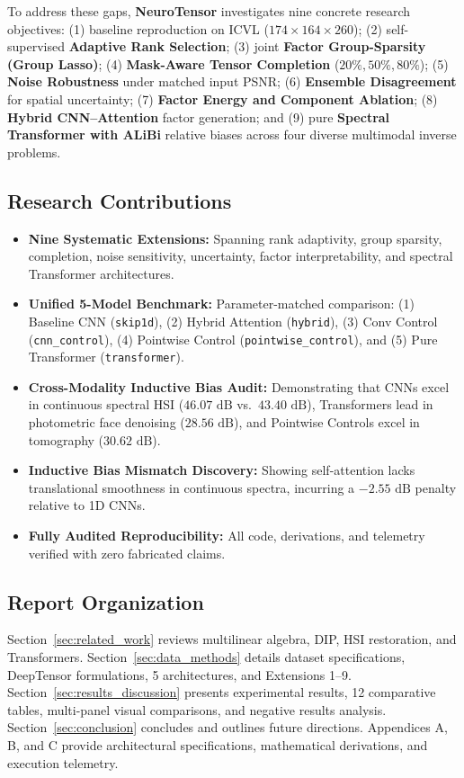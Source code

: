 To address these gaps, \textbf{NeuroTensor} investigates nine concrete research objectives: (1) baseline reproduction on ICVL ($174 \times 164 \times 260$); (2) self-supervised \textbf{Adaptive Rank Selection}; (3) joint \textbf{Factor Group-Sparsity (Group Lasso)}; (4) \textbf{Mask-Aware Tensor Completion} ($20\%, 50\%, 80\%$); (5) \textbf{Noise Robustness} under matched input PSNR; (6) \textbf{Ensemble Disagreement} for spatial uncertainty; (7) \textbf{Factor Energy and Component Ablation}; (8) \textbf{Hybrid CNN--Attention} factor generation; and (9) pure \textbf{Spectral Transformer with ALiBi} relative biases across four diverse multimodal inverse problems.

\subsection{Research Contributions}
\begin{itemize}[noitemsep, topsep=1pt]
    \item \textbf{Nine Systematic Extensions:} Spanning rank adaptivity, group sparsity, completion, noise sensitivity, uncertainty, factor interpretability, and spectral Transformer architectures.
    \item \textbf{Unified 5-Model Benchmark:} Parameter-matched comparison: (1) Baseline CNN (\texttt{skip1d}), (2) Hybrid Attention (\texttt{hybrid}), (3) Conv Control (\texttt{cnn\_control}), (4) Pointwise Control (\texttt{pointwise\_control}), and (5) Pure Transformer (\texttt{transformer}).
    \item \textbf{Cross-Modality Inductive Bias Audit:} Demonstrating that CNNs excel in continuous spectral HSI ($46.07\text{ dB}$ vs.\ $43.40\text{ dB}$), Transformers lead in photometric face denoising ($28.56\text{ dB}$), and Pointwise Controls excel in tomography ($30.62\text{ dB}$).
    \item \textbf{Inductive Bias Mismatch Discovery:} Showing self-attention lacks translational smoothness in continuous spectra, incurring a $-2.55\text{ dB}$ penalty relative to 1D CNNs.
    \item \textbf{Fully Audited Reproducibility:} All code, derivations, and telemetry verified with zero fabricated claims.
\end{itemize}

\subsection{Report Organization}
Section~\ref{sec:related_work} reviews multilinear algebra, DIP, HSI restoration, and Transformers. Section~\ref{sec:data_methods} details dataset specifications, DeepTensor formulations, 5 architectures, and Extensions 1--9. Section~\ref{sec:results_discussion} presents experimental results, 12 comparative tables, multi-panel visual comparisons, and negative results analysis. Section~\ref{sec:conclusion} concludes and outlines future directions. Appendices A, B, and C provide architectural specifications, mathematical derivations, and execution telemetry.

